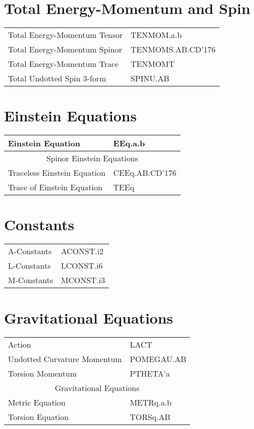 \documentclass[twoside,openright]{report}
\newcommand{\grgtt}{\ttfamily}
\renewcommand{\tt}{\grgtt}
\newcommand{\cc}{{\tt \char'176}}           %
\begin{document}
\begin{center}
\section{Total Energy-Momentum and Spin}
\begin{tabular}{|l|l|}\hline
\tt    Total Energy-Momentum Tensor &\tt   TENMOM.a.b\\
\tt    Total Energy-Momentum Spinor &\tt   TENMOMS.AB.CD\cc\\
\tt    Total Energy-Momentum Trace  &\tt   TENMOMT\\
\tt    Total Undotted Spin 3-form   &\tt   SPINU.AB\\
\hline\end{tabular}

\section{Einstein Equations}
\begin{tabular}{|l|l|}\hline
\tt    Einstein Equation           &\tt   EEq.a.b\\
\hline
\multicolumn{2}{|c|}{\tt    Spinor Einstein Equations}\\
\tt    Traceless Einstein Equation &\tt   CEEq.AB.CD\cc\\
\tt    Trace of Einstein Equation  &\tt   TEEq\\
\hline\end{tabular}

\section{Constants}
\begin{tabular}{|l|l|}\hline
\tt    A-Constants &\tt   ACONST.i2\\
\tt    L-Constants &\tt   LCONST.i6\\
\tt    M-Constants &\tt   MCONST.i3\\
\hline\end{tabular}

\section{Gravitational Equations}
\begin{tabular}{|l|l|}\hline
\tt    Action                      &\tt  LACT\\
\tt    Undotted Curvature Momentum &\tt  POMEGAU.AB\\
\tt    Torsion Momentum            &\tt  PTHETA'a\\
\hline
\multicolumn{2}{|c|}{\tt    Gravitational Equations}\\
\tt    Metric Equation             &\tt  METRq.a.b\\
\tt    Torsion Equation            &\tt  TORSq.AB\\
\hline\end{tabular}

\end{center}
\end{document}
